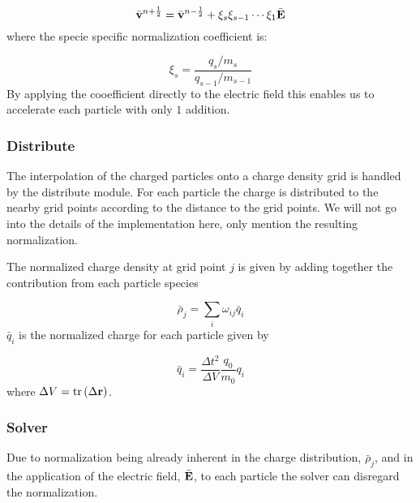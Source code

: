             \begin{equation}
                \bar{\vb{v}}^{n+\frac{1}{2}} =  \bar{\vb{v}}^{n-\frac{1}{2}} + \xi_s\xi_{s-1}\cdots \xi_1\bar{\vb{E}}
            \end{equation}
            where the specie specific normalization coefficient is:

            \begin{equation}
                \xi_s = \frac{q_s/m_s}{q_{s-1}/m_{s-1}}
            \end{equation}
%
            By applying the cooefficient directly to the electric field
            this enables us to accelerate each particle with only \(1\) addition.

        \subsubsection{Distribute}
            The interpolation of the charged particles onto a charge density grid
            is handled by the distribute module. For each particle the charge is distributed
            to the nearby grid points according to the distance to the grid points. We will not go into the details of
            the implementation here, only mention the resulting normalization.

            The normalized charge density at grid point \(j\) is given by adding together
            the contribution from each particle species

            \begin{equation}
                \bar{\rho}_j = \sum_i \omega_{ij} \bar{q}_i
            \end{equation}
            \(\bar{q}_i\) is the normalized charge for each particle given by

            \begin{equation}
                \bar{q}_i = \frac{\Delta t^2}{\Delta V} \frac{q_0}{m_0} q_i
            \end{equation}
            where \(\Delta V = \trace{(\Delta \vb{r})}\).

        \subsubsection{Solver}
            Due to normalization being already inherent in the charge distribution, \(\bar{\rho}_j\),  and
            in the application of the electric field, \(\bar{\vb{E}}\), to each particle the
            solver can disregard the normalization.
